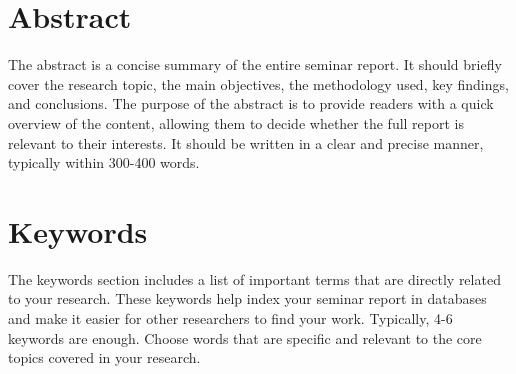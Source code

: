 \clearpage
\section*{Abstract}
The abstract is a concise summary of the entire seminar report. It should briefly cover the research topic, the main objectives, the methodology used, key findings, and conclusions. The purpose of the abstract is to provide readers with a quick overview of the content, allowing them to decide whether the full report is relevant to their interests. It should be written in a clear and precise manner, typically within 300-400 words.


\section*{Keywords}
The keywords section includes a list of important terms that are directly related to your research. These keywords help index your seminar report in databases and make it easier for other researchers to find your work. Typically, 4-6 keywords are enough. Choose words that are specific and relevant to the core topics covered in your research.